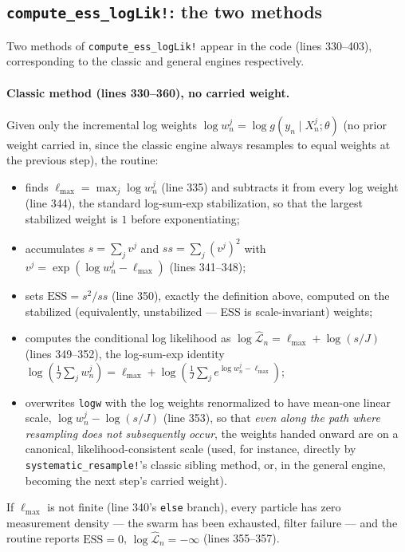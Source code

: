 \documentclass[11pt]{article}
\newcommand{\ESS}{\mathrm{ESS}}
\begin{document}
\subsection{\texttt{compute\_ess\_logLik!}: the two methods}

Two methods of \texttt{compute\_ess\_logLik!} appear in the code
(lines 330--403), corresponding to the classic and general engines
respectively.

\paragraph{Classic method (lines 330--360), no carried weight.} Given only
the incremental log weights $\log w_n^j = \log g(y_n\mid X_n^j;\theta)$ (no
prior weight carried in, since the classic engine always resamples to equal
weights at the previous step), the routine:
\begin{itemize}
\item finds $\ell_{\max} = \max_j \log w_n^j$ (line 335) and subtracts it from
every log weight (line 344), the standard log-sum-exp stabilization, so that
the largest stabilized weight is $1$ before exponentiating;
\item accumulates $s=\sum_j v^j$ and $ss=\sum_j (v^j)^2$ with $v^j =
\exp(\log w_n^j - \ell_{\max})$ (lines 341--348);
\item sets $\ESS = s^2/ss$ (line 350), exactly the definition above, computed
on the stabilized (equivalently, unstabilized — ESS is scale-invariant)
weights;
\item computes the conditional log likelihood as
$\log\widehat{\mathcal L}_n = \ell_{\max} + \log(s/J)$ (lines 349--352), the
log-sum-exp identity
$\log\!\left(\frac1J\sum_j w_n^j\right) = \ell_{\max}+\log\!\left(\frac1J\sum_j
e^{\log w_n^j - \ell_{\max}}\right)$;
\item overwrites \texttt{logw} with the log weights renormalized to have
mean-one linear scale, $\log w_n^j - \log(s/J)$ (line 353), so that
\emph{even along the path where resampling does not subsequently occur}, the
weights handed onward are on a canonical, likelihood-consistent scale (used,
for instance, directly by \texttt{systematic\_resample!}'s classic sibling
method, or, in the general engine, becoming the next step's carried weight).
\end{itemize}
If $\ell_{\max}$ is not finite (line 340's \texttt{else} branch), every
particle has zero measurement density — the swarm has been exhausted, filter
failure — and the routine reports $\ESS=0$, $\log\widehat{\mathcal L}_n =
-\infty$ (lines 355--357).
\end{document}
